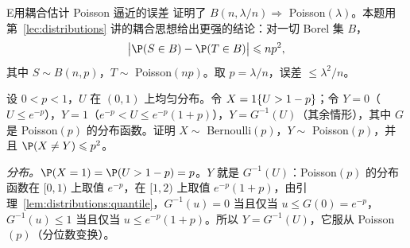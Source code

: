 \begin{probleme}{E}{用耦合估计 Poisson 逼近的误差}
 证明了 $B(n,\lambda/n)\Rightarrow$ Poisson$(\lambda)$。本题用第~\ref{lec:distributions} 讲的耦合思想给出更强的结论：对一切 Borel 集 $B$，
\[
\bigl\lvert \P(S\in B)-\P(T\in B)\bigr\rvert\leqslant np^2,
\]
其中 $S\sim B(n,p)$，$T\sim$ Poisson$(np)$。取 $p=\lambda/n$，误差 $\leqslant\lambda^2/n$。
\begin{questions}
\item 设 $0<p<1$，$U$ 在 $(0,1)$ 上均匀分布。令 $X=1\{U>1-p\}$；令 $Y=0$（$U\leqslant e^{-p}$），$Y=1$（$e^{-p}<U\leqslant e^{-p}(1+p)$），$Y=G^{-1}(U)$（其余情形），其中 $G$ 是 Poisson$(p)$ 的分布函数。证明 $X\sim$ Bernoulli$(p)$，$Y\sim$ Poisson$(p)$，并且 $\P(X\neq Y)\leqslant p^2$。
\begin{solution}
\emph{分布。}$\P(X=1)=\P(U>1-p)=p$。$Y$ 就是 $G^{-1}(U)$：Poisson$(p)$ 的分布函数在 $[0,1)$ 上取值 $e^{-p}$，在 $[1,2)$ 上取值 $e^{-p}(1+p)$，由引理~\ref{lem:distributions:quantile}，$G^{-1}(u)=0$ 当且仅当 $u\leqslant G(0)=e^{-p}$，$G^{-1}(u)\leqslant1$ 当且仅当 $u\leqslant e^{-p}(1+p)$。所以 $Y=G^{-1}(U)$，它服从 Poisson$(p)$（分位数变换）。


\end{solution}
\end{questions}
\end{probleme}
